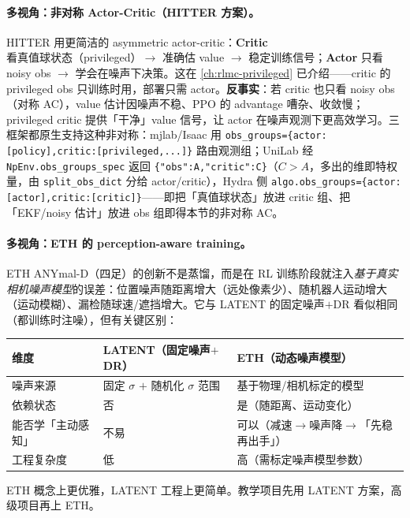 \paragraph{多视角：非对称 Actor-Critic（HITTER 方案）。}HITTER 用更简洁的 asymmetric actor-critic\cite{tennis_hitter2025}：\textbf{Critic} 看真值球状态（privileged）$\to$ 准确估 value $\to$ 稳定训练信号；\textbf{Actor} 只看 noisy obs $\to$ 学会在噪声下决策。这在 \cref{ch:rlmc-privileged} 已介绍——critic 的 privileged obs 只训练时用，部署只需 actor。\textbf{反事实}：若 critic 也只看 noisy obs（对称 AC），value 估计因噪声不稳、PPO 的 advantage 嘈杂、收敛慢；privileged critic 提供「干净」value 信号，让 actor 在噪声观测下更高效学习。三框架都原生支持这种非对称：mjlab/Isaac 用 \texttt{obs\_groups=\{actor:[policy],critic:[privileged,...]\}} 路由观测组；UniLab 经 \texttt{NpEnv.obs\_groups\_spec} 返回 \texttt{\{"obs":A,"critic":C\}}（$C>A$，多出的维即特权量，由 \texttt{split\_obs\_dict} 分给 actor/critic），Hydra 侧 \texttt{algo.obs\_groups=\{actor:[actor],critic:[critic]\}}——即把「真值球状态」放进 critic 组、把「EKF/noisy 估计」放进 obs 组即得本节的非对称 AC。

\paragraph{多视角：ETH 的 perception-aware training。}ETH ANYmal-D（四足）的创新不是蒸馏，而是在 RL 训练阶段就注入\emph{基于真实相机噪声模型}的误差\cite{tennis_eth2025badminton}：位置噪声随距离增大（远处像素少）、随机器人运动增大（运动模糊）、漏检随球速/遮挡增大。它与 LATENT 的固定噪声$+$DR 看似相同（都训练时注噪），但有关键区别：

\begin{center}
\small
\begin{tabular}{@{}lll@{}}
\toprule
维度 & LATENT（固定噪声$+$DR） & ETH（动态噪声模型） \\
\midrule
噪声来源 & 固定 $\sigma$ $+$ 随机化 $\sigma$ 范围 & 基于物理/相机标定的模型 \\
依赖状态 & 否 & 是（随距离、运动变化） \\
能否学「主动感知」 & 不易 & 可以（减速$\to$噪声降$\to$「先稳再出手」） \\
工程复杂度 & 低 & 高（需标定噪声模型参数） \\
\bottomrule
\end{tabular}
\end{center}

ETH 概念上更优雅，LATENT 工程上更简单。教学项目先用 LATENT 方案，高级项目再上 ETH。

